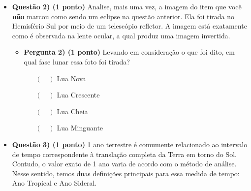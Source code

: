 \documentclass[a4paper, 12pt]{article}
\begin{document}
\begin{flushleft}
\begin{itemize}
\begin{itemize}
\begin{multicols}{2}
\begin{figure}[H]
							\captionsetup{labelformat=empty}
							\caption{(b)}
						\end{figure}
					\end{multicols}
				\item \textbf{Pergunta 1b) (0.25 ponto)} Que tipo de eclipse é mostrado?
					\begin{itemize}
						\item[$(\quad)$] Eclipse lunar
						\item[$(\quad)$] Eclipse solar
					\end{itemize}
				\item \textbf{Pergunta 1c) (0.25 ponto)} Em qual fase lunar esse eclipse aconteceu?
					\begin{itemize}
						\item[$(\quad)$] Lua Nova
						\item[$(\quad)$] Lua Crescente
						\item[$(\quad)$] Lua Cheia
						\item[$(\quad)$] Lua Minguante
					\end{itemize}
			\end{itemize}
		\item \textbf{Questão 2) (1 ponto)} Analise, mais uma vez, a imagem do item que você \textbf{não} marcou como sendo um eclipse na questão anterior. Ela foi tirada no Hemisfério Sul por meio de um telescópio refletor. A imagem está exatamente como é observada na lente ocular, a qual produz uma imagem invertida.
			\begin{itemize}
				\item \textbf{Pergunta 2) (1 ponto)} Levando em consideração o que foi dito, em qual fase lunar essa foto foi tirada?
					\begin{itemize}
						\item[$(\quad)$] Lua Nova
						\item[$(\quad)$] Lua Crescente
						\item[$(\quad)$] Lua Cheia
						\item[$(\quad)$] Lua Minguante
					\end{itemize}
			\end{itemize}
		\item \textbf{Questão 3) (1 ponto)} 1 ano terrestre é comumente relacionado ao intervalo de tempo correspondente à translação completa da Terra em torno do Sol. Contudo, o valor exato de 1 ano varia de acordo com o método de análise. Nesse sentido, temos duas definições principais para essa medida de tempo: Ano Tropical e Ano Sideral.

\end{itemize}
\end{flushleft}
\end{document}
